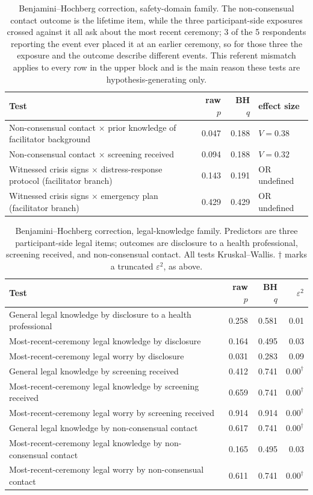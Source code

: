 \documentclass[12pt]{article}
\begin{document}
\begin{table}[htbp]
\centering
\caption{Benjamini--Hochberg correction, safety-domain family. The non-consensual contact outcome is the
lifetime item, while the three participant-side exposures crossed against it all ask about the most recent
ceremony; 3 of the 5 respondents reporting the event ever placed it at an earlier ceremony, so for those
three the exposure and the outcome describe different events. This referent mismatch applies to every row
in the upper block and is the main reason these tests are hypothesis-generating only.}
\begin{tabular}{p{8.2cm}rrl}
\toprule
Test & raw $p$ & BH $q$ & effect size \\
\midrule
Non-consensual contact $\times$ prior knowledge of facilitator background & 0.047 & 0.188 & $V=0.38$ \\
Non-consensual contact $\times$ screening received & 0.094 & 0.188 & $V=0.32$ \\
\addlinespace
Witnessed crisis signs $\times$ distress-response protocol (facilitator branch) & 0.143 & 0.191 & OR undefined \\
Witnessed crisis signs $\times$ emergency plan (facilitator branch) & 0.429 & 0.429 & OR undefined \\
\bottomrule
\end{tabular}
\end{table}

\begin{table}[htbp]
\centering
\caption{Benjamini--Hochberg correction, legal-knowledge family. Predictors are three participant-side
legal items; outcomes are disclosure to a health professional, screening received, and non-consensual
contact. All tests Kruskal--Wallis. $\dagger$ marks a truncated $\varepsilon^2$, as above.}
\begin{tabular}{lrrr}
\toprule
Test & raw $p$ & BH $q$ & $\varepsilon^2$ \\
\midrule
General legal knowledge by disclosure to a health professional & 0.258 & 0.581 & 0.01 \\
Most-recent-ceremony legal knowledge by disclosure & 0.164 & 0.495 & 0.03 \\
Most-recent-ceremony legal worry by disclosure & 0.031 & 0.283 & 0.09 \\
General legal knowledge by screening received & 0.412 & 0.741 & $0.00^{\dagger}$ \\
Most-recent-ceremony legal knowledge by screening received & 0.659 & 0.741 & $0.00^{\dagger}$ \\
Most-recent-ceremony legal worry by screening received & 0.914 & 0.914 & $0.00^{\dagger}$ \\
General legal knowledge by non-consensual contact & 0.617 & 0.741 & $0.00^{\dagger}$ \\
Most-recent-ceremony legal knowledge by non-consensual contact & 0.165 & 0.495 & 0.03 \\
Most-recent-ceremony legal worry by non-consensual contact & 0.611 & 0.741 & $0.00^{\dagger}$ \\
\bottomrule
\end{tabular}
\end{table}
\end{document}
